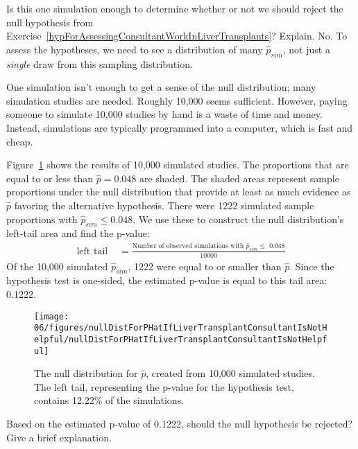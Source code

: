 \begin{example}{Is this one simulation enough to determine whether or not we should reject the null hypothesis from Exercise~\ref{hypForAssessingConsultantWorkInLiverTransplants}? Explain.}
No. To assess the hypotheses, we need to see a distribution of many $\hat{p}_{sim}$, not just a \emph{single} draw from this sampling distribution.
\end{example}

One simulation isn't enough to get a sense of the null distribution; many simulation studies are needed. Roughly 10,000 seems sufficient. However, paying someone to simulate 10,000 studies by hand is a waste of time and money. Instead, simulations are typically programmed into a computer, which is fast and cheap.

Figure~\ref{nullDistForPHatIfLiverTransplantConsultantIsNotHelpful} shows the results of 10,000 simulated studies. The proportions that are equal to or less than $\hat{p}=0.048$ are shaded. The shaded areas represent sample proportions under the null distribution that provide at least as much evidence as $\hat{p}$ favoring the alternative hypothesis. There were 1222 simulated sample proportions with $\hat{p}_{sim} \leq 0.048$. We use these to construct the null distribution's left-tail area and find the p-value:
\begin{align}
\text{left tail }\label{estOfPValueBasedOnSimulatedNullForSingleProportion}
	&= \frac{\text{Number of observed simulations with }\hat{p}_{sim}\leq\text{ 0.048}}{10000}
\end{align}
Of the 10,000 simulated $\hat{p}_{sim}$, 1222 were equal to or smaller than $\hat{p}$. Since the hypothesis test is one-sided, the estimated p-value is equal to this tail area: 0.1222.
\begin{figure}
\centering
\texttt{[image: 06/figures/nullDistForPHatIfLiverTransplantConsultantIsNotHelpful/nullDistForPHatIfLiverTransplantConsultantIsNotHelpful]}
\caption{The null distribution for $\hat{p}$, created from 10,000 simulated studies. The left tail, representing the p-value for the hypothesis test, contains 12.22\% of the simulations.}
\label{nullDistForPHatIfLiverTransplantConsultantIsNotHelpful}
\end{figure}

\begin{exercise} \label{rejectOrNotForHTForLiverDonorSurgicalConsultant}
Based on the estimated p-value of 0.1222, should the null hypothesis be rejected? Give a brief explanation.
\end{exercise}

